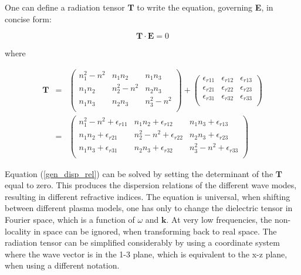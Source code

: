 \documentclass[a4paper,11pt]{article}
\begin{document}
One can define a radiation tensor \textbf{T} to write the equation,
governing \textbf{E}, in concise form:

\begin{equation}\label{gen_disp_rel}
    \mathbf{T}\cdot \mathbf{E}=0
\end{equation}

where

\begin{eqnarray}
    \mathbf{T}&=&\left(%
\begin{array}{ccc}
   n_1^2 -n^2 &  n_1 n_2 & n_1 n_3 \\
n_1 n_2 & n_2^2 -n^2 & n_2 n_3 \\
 n_1 n_3  &  n_2 n_3  &  n_3^2-n^2 \\
\end{array}%
\right)+\left(%
 \begin{array}{ccc}
 \epsilon_{r11} & \epsilon_{r12} & \epsilon_{r13} \\
 \epsilon_{r21} & \epsilon_{r22} & \epsilon_{r23} \\
 \epsilon_{r31} & \epsilon_{r32} & \epsilon_{r33} \\
 \end{array}
  \right)\\
&=&
\left(%
\begin{array}{ccc}
   n_1^2 -n^2 +\epsilon_{r11} &  n_1 n_2+\epsilon_{r12} & n_1 n_3 +\epsilon_{r13}\\
n_1 n_2 +\epsilon_{r21}& n_2^2 -n^2+\epsilon_{r22} & n_2 n_3 +\epsilon_{r23}\\
 n_1 n_3 +\epsilon_{r31} &  n_2 n_3 +\epsilon_{r32} &  n_3^2-n^2+\epsilon_{r33} \\
\end{array}%
\right)
\end{eqnarray}


Equation (\ref{gen_disp_rel}) can be solved by setting the determinant
of the $\mathbf{T}$ equal to zero. This produces the dispersion
relations of the different wave modes, resulting in different refractive indices. The equation is universal, when shifting
between different plasma models, one has only to change the
dielectric tensor in Fourier space, which is a function of $\omega$
and $\mathbf{k}$. At very low frequencies, the non-locality in space
can be ignored, when transforming back to real space. The radiation tensor can be simplified considerably by using a coordinate system where the wave vector is in the 1-3 plane, which is equivalent to the x-z plane, when using a different notation.
\end{document}
